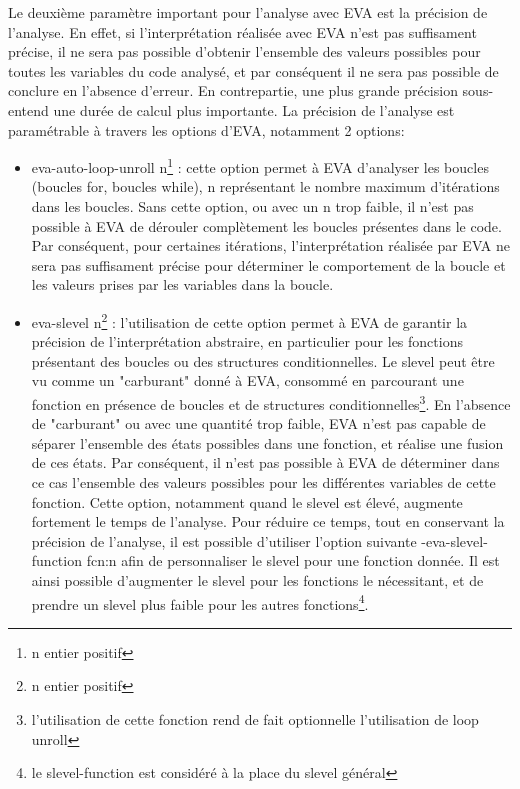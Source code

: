 \newpage \noindent Le deuxième paramètre important pour l'analyse avec EVA est la précision de l'analyse. En effet, si l'interprétation réalisée avec EVA n'est pas suffisament précise, il ne sera pas possible d'obtenir l'ensemble des valeurs possibles pour toutes les variables du code analysé, et par conséquent il ne sera pas possible de conclure en l'absence d'erreur. En contrepartie, une plus grande précision sous-entend une durée de calcul plus importante.
\newline \noindent La précision de l'analyse est paramétrable à travers les options d'EVA, notamment 2 options:
\begin{itemize}
	\item eva-auto-loop-unroll n\footnote{n entier positif} : cette option permet à EVA d'analyser les boucles (boucles for, boucles while), n représentant le nombre maximum d'itérations dans les boucles. Sans cette option, ou avec un n trop faible, il n'est pas possible à EVA de dérouler complètement les boucles présentes dans le code. Par conséquent, pour certaines itérations, l'interprétation réalisée par EVA ne sera pas suffisament précise pour déterminer le comportement de la boucle et les valeurs prises par les variables dans la boucle.
	\item eva-slevel n\footnote{n entier positif} : l'utilisation de cette option permet à EVA de garantir la précision de l'interprétation abstraire, en particulier pour les fonctions présentant des boucles ou des structures conditionnelles. Le slevel peut être vu comme un "carburant" donné à EVA, consommé en parcourant une fonction en présence de boucles et de structures conditionnelles\footnote{l'utilisation de cette fonction rend de fait optionnelle l'utilisation de loop unroll}. En l'absence de "carburant" ou avec une quantité trop faible, EVA n'est pas capable de séparer l'ensemble des états possibles dans une fonction, et réalise une fusion de ces états. Par conséquent, il n'est pas possible à EVA de déterminer dans ce cas l'ensemble des valeurs possibles pour les différentes variables de cette fonction. Cette option, notamment quand le slevel est élevé, augmente fortement le temps de l'analyse. Pour réduire ce temps, tout en conservant la précision de l'analyse, il est possible d'utiliser l'option suivante -eva-slevel-function fcn:n afin de personnaliser le slevel pour une fonction donnée. Il est ainsi possible d'augmenter le slevel pour les fonctions le nécessitant, et de prendre un slevel plus faible pour les autres fonctions\footnote{le slevel-function est considéré à la place du slevel général}.
\end{itemize}

